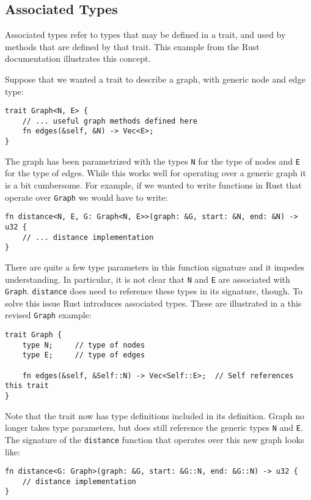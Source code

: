 \subsection{Associated Types}
Associated types refer to types that may be defined in a trait, and used by
methods that are defined by that trait. This example from the Rust
documentation \cite{assoctypes} illustrates this concept.

Suppose that we wanted a trait to describe a graph, with generic node and edge
type:

\begin{lstlisting}[nolol]
trait Graph<N, E> {
    // ... useful graph methods defined here
    fn edges(&self, &N) -> Vec<E>;
}
\end{lstlisting}

The graph has been parametrized with the types \lstinline{N} for the type of 
nodes and \lstinline{E} for the type of edges. While this works well for operating
over a generic graph it is a bit cumbersome. For example, if we wanted to write
functions in Rust that operate over \lstinline{Graph} we would have to write:

\begin{lstlisting}[nolol]
fn distance<N, E, G: Graph<N, E>>(graph: &G, start: &N, end: &N) -> u32 {
    // ... distance implementation
}
\end{lstlisting}

There are quite a few type parameters in this function signature and it impedes
understanding. In particular, it is not clear that \lstinline{N} and
\lstinline{E} are associated with \lstinline{Graph}. \lstinline{distance} does
need to reference these types in its signature, though. To solve this issue
Rust introduces associated types. These are illustrated in a this revised 
\lstinline{Graph} example:

\begin{lstlisting}[nolol]
trait Graph {
    type N;     // type of nodes
    type E;     // type of edges

    fn edges(&self, &Self::N) -> Vec<Self::E>;  // Self references this trait
}
\end{lstlisting}

Note that the trait now has type definitions included in its definition. Graph
no longer takes type parameters, but does still reference the generic types
\lstinline{N} and \lstinline{E}. The signature of the \lstinline{distance}
function that operates over this new graph looks like:

\begin{lstlisting}[nolol]
fn distance<G: Graph>(graph: &G, start: &G::N, end: &G::N) -> u32 {
    // distance implementation
}
\end{lstlisting}

